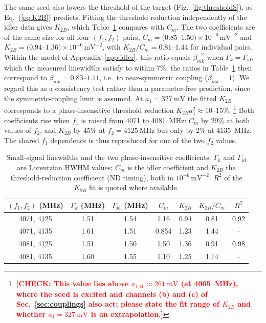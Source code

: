 \documentclass[aps,prb,reprint,superscriptaddress,floatfix]{revtex4-2}
\newcommand{\chk}[1]{\textcolor{red}{\textbf{[CHECK: #1]}}}
\newcommand{\chk}[1]{}
\begin{document}
The same seed also lowers the threshold of the target (Fig.~\ref{fig:thresholdS}), as Eq.~(\ref{eq:K2B}) predicts. Fitting the threshold reduction independently of the idler data gives $K_{2B}$, which Table~\ref{tab:coeff} compares with $C_m$. The two coefficients are of the same size for all four $(f_1,f_2)$ pairs, $C_m=(0.85$--$1.50)\times10^{-6}\,\mathrm{mV}^{-2}$ and $K_{2B}=(0.94$--$1.36)\times10^{-6}\,\mathrm{mV}^{-2}$, with $K_{2B}/C_m=0.81$--$1.44$ for individual pairs. Within the model of Appendix~\ref{app:idler}, this ratio equals $\beta_{mk}^{-2}$ when $\Gamma_k=\Gamma_{\mathrm{id}}$, which the measured linewidths satisfy to within 7\%; the ratios in Table~\ref{tab:coeff} then correspond to $\beta_{mk}=0.83$--$1.11$, i.e.\ to near-symmetric coupling ($\beta_{mk}=1$). We regard this as a consistency test rather than a parameter-free prediction, since the symmetric-coupling limit is assumed. At $a_1=\SI{327}{\milli\volt}$ the fitted $K_{2B}$ corresponds to a phase-insensitive threshold reduction $K_{2B}a_1^2\approx10$--$15\%$.%
\footnote{\chk{This value lies above $a_{1,\mathrm{th}}\approx\SI{261}{\milli\volt}$ (at \SI{4065}{\mega\hertz}), where the seed is excited and channels (b) and (c) of Sec.~\ref{sec:couplings} also act; please state the fit range of $K_{2B}$ and whether $a_1=\SI{327}{\milli\volt}$ is an extrapolation.}}
Both coefficients rise when $f_1$ is raised from 4071 to \SI{4081}{\mega\hertz}: $C_m$ by 29\% at both values of $f_2$, and $K_{2B}$ by 45\% at $f_2=\SI{4125}{\mega\hertz}$ but only by 2\% at \SI{4135}{\mega\hertz}. The shared $f_1$ dependence is thus reproduced for one of the two $f_2$ values.

\begin{table}
\caption{Small-signal linewidths and the two phase-insensitive coefficients. $\Gamma_k$ and $\Gamma_{\mathrm{id}}$ are Lorentzian HWHM values; $C_m$ is the idler coefficient and $K_{2B}$ the threshold-reduction coefficient (ND timing), both in $10^{-6}\,\mathrm{mV}^{-2}$. $R^2$ of the $K_{2B}$ fit is quoted where available.}
\label{tab:coeff}
\begin{ruledtabular}
\begin{tabular}{ccccccc}
$(f_1,f_2)$ (MHz) & $\Gamma_k$ (MHz) & $\Gamma_{\mathrm{id}}$ (MHz) & $C_m$ & $K_{2B}$ & $K_{2B}/C_m$ & $R^2$\\
\hline
4071, 4125 & 1.51 & 1.54 & 1.16 & 0.94 & 0.81 & 0.92\\
4071, 4135 & 1.61 & 1.51 & 0.854 & 1.23 & 1.44 & --\\
4081, 4125 & 1.51 & 1.50 & 1.50 & 1.36 & 0.91 & 0.98\\
4081, 4135 & 1.60 & 1.55 & 1.10 & 1.25 & 1.14 & --\\
\end{tabular}
\end{ruledtabular}
\end{table}
\end{document}
